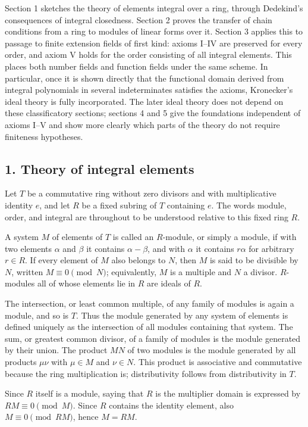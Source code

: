 \documentclass[11pt]{article}
\begin{document}
Section 1 sketches the theory of elements integral over a ring, through Dedekind's consequences of integral closedness. Section 2 proves the transfer of chain conditions from a ring to modules of linear forms over it. Section 3 applies this to passage to finite extension fields of first kind: axioms I--IV are preserved for every order, and axiom V holds for the order consisting of all integral elements. This places both number fields and function fields under the same scheme. In particular, once it is shown directly that the functional domain derived from integral polynomials in several indeterminates satisfies the axioms, Kronecker's ideal theory is fully incorporated. The later ideal theory does not depend on these classificatory sections; sections 4 and 5 give the foundations independent of axioms I--V and show more clearly which parts of the theory do not require finiteness hypotheses.

\subsection{1. Theory of integral elements}

Let $T$ be a commutative ring without zero divisors and with multiplicative identity $e$, and let $R$ be a fixed subring of $T$ containing $e$. The words module, order, and integral are throughout to be understood relative to this fixed ring $R$.

A system $M$ of elements of $T$ is called an $R$-module, or simply a module, if with two elements $\alpha$ and $\beta$ it contains $\alpha-\beta$, and with $\alpha$ it contains $r\alpha$ for arbitrary $r\in R$. If every element of $M$ also belongs to $N$, then $M$ is said to be divisible by $N$, written $M\equiv0\pmod N$; equivalently, $M$ is a multiple and $N$ a divisor. $R$-modules all of whose elements lie in $R$ are ideals of $R$.

The intersection, or least common multiple, of any family of modules is again a module, and so is $T$. Thus the module generated by any system of elements is defined uniquely as the intersection of all modules containing that system. The sum, or greatest common divisor, of a family of modules is the module generated by their union. The product $MN$ of two modules is the module generated by all products $\mu\nu$ with $\mu\in M$ and $\nu\in N$. This product is associative and commutative because the ring multiplication is; distributivity follows from distributivity in $T$.

Since $R$ itself is a module, saying that $R$ is the multiplier domain is expressed by $RM\equiv0\pmod M$. Since $R$ contains the identity element, also $M\equiv0\pmod{RM}$, hence $M=RM$.
\end{document}
